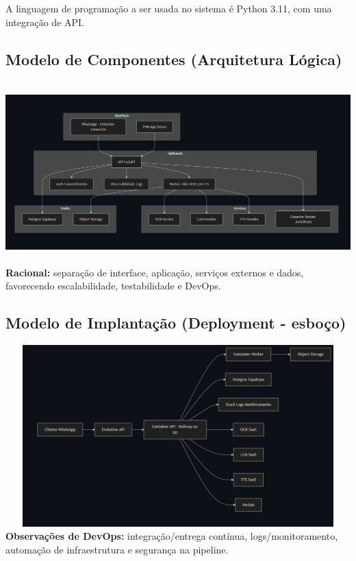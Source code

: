 \documentclass{article}
\begin{document}
A linguagem de programação a ser usada no sistema é Python 3.11, com uma integração de API.

\subsection{Modelo de Componentes (Arquitetura Lógica)}
\includegraphics[width=1.3\textwidth,height=7cm,keepaspectratio]{images/Modelo-de-Componentes.jpg}
\textbf{Racional:} separação de interface, aplicação, serviços externos e dados, favorecendo escalabilidade, testabilidade e DevOps.

\subsection{Modelo de Implantação (Deployment - esboço)}
\includegraphics[width=1.4\textwidth,height=7cm,keepaspectratio]{images/Modelo-de-Implantacao.jpg}
\textbf{Observações de DevOps: } integração/entrega contínua, logs/monitoramento, automação de infraestrutura e segurança na pipeline.
\end{document}
